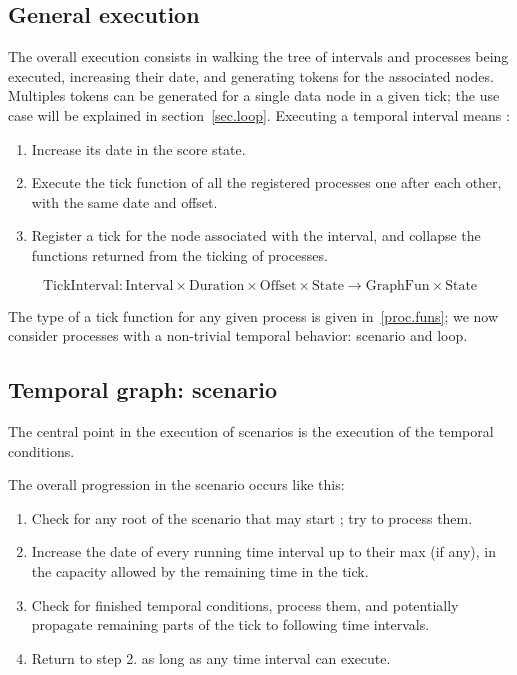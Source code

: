 \documentclass{article}
\begin{document}
\subsection{General execution}
The overall execution consists in walking the tree of intervals and processes being executed, increasing their date, and generating tokens for the associated nodes.
Multiples tokens can be generated for a single data node in a given tick; the use case will be explained in section~\ref{sec.loop}.
Executing a temporal interval means : 

\begin{enumerate}
\item Increase its date in the score state. 
\item Execute the tick function of all the registered processes one after each other, with the same date and offset.
\item Register a tick for the node associated with the interval, and collapse the functions returned from the ticking of processes.
\end{enumerate}
\[
\mathrm{TickInterval}: \mathrm{Interval} \times \mathrm{Duration} \times \mathrm{Offset} \times \mathrm{State} \rightarrow \mathrm{GraphFun} \times \mathrm{State}
\]

The type of a tick function for any given process is given in~\ref{proc.funs}; we now consider processes with a non-trivial temporal behavior: scenario and loop.

\subsection{Temporal graph: scenario}\label{sec.scenario}
The central point in the execution of scenarios is the execution of the temporal conditions. 

The overall progression in the scenario occurs like this: 

\begin{enumerate}
\item Check for any root of the scenario that may start ; try to process them.
\item Increase the date of every running time interval up to their max (if any), in the capacity allowed by the remaining time in the tick.
\item Check for finished temporal conditions, process them, and potentially propagate remaining parts of the tick to following time intervals.
\item Return to step 2. as long as any time interval can execute.
\end{enumerate}
\end{document}

